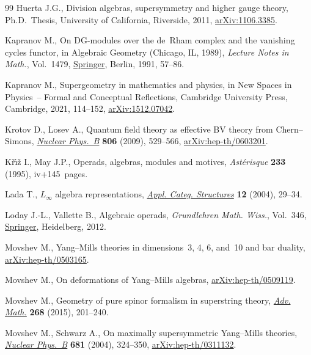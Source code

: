 \documentclass[pdftex]{sigma}
\numberwithin{equation}{section}
\begin{document}
\begin{thebibliography}{99}
Huerta J.G., Division algebras, supersymmetry and higher gauge theory, Ph.D.~Thesis, {U}niversity of California, Riverside, 2011, \href{https://arxiv.org/abs/1106.3385}{arXiv:1106.3385}.

Kapranov M., On {DG}-modules over the de~{R}ham complex and the vanishing
 cycles functor, in Algebraic {G}eometry ({C}hicago, {IL}, 1989),
 \textit{Lecture Notes in Math.}, Vol.~1479, \href{https://doi.org/10.1007/BFb0086264}{Springer}, Berlin, 1991, 57--86.

Kapranov M., Supergeometry in mathematics and physics, in New Spaces in
 Physics~-- Formal and Conceptual Reflections, Cambridge University Press,
 Cambridge, 2021, 114--152, \href{https://arxiv.org/abs/1512.07042}{arXiv:1512.07042}.

Krotov D., Losev A., Quantum field theory as effective {BV} theory from
 {C}hern--{S}imons, \href{https://doi.org/10.1016/j.nuclphysb.2008.07.021}{\textit{Nuclear Phys.~B}} \textbf{806} (2009), 529--566,
 \href{https://arxiv.org/abs/hep-th/0603201}{arXiv:hep-th/0603201}.

K\v{r}\'{\i}\v{z} I., May J.P., Operads, algebras, modules and motives,
 \textit{Ast\'erisque} \textbf{233} (1995), iv+145~pages.

Lada T., {$L_\infty$} algebra representations, \href{https://doi.org/10.1023/B:APCS.0000013809.71153.30}{\textit{Appl. Categ. Structures}}
 \textbf{12} (2004), 29--34.

Loday J.-L., Vallette B., Algebraic operads, \textit{Grundlehren Math. Wiss.},
 Vol.~346, \href{https://doi.org/10.1007/978-3-642-30362-3}{Springer}, Heidelberg, 2012.

Movshev M., {Y}ang--{M}ills theories in dimensions~3, 4, 6, and~10 and bar
 duality, \href{https://arxiv.org/abs/hep-th/0503165}{arXiv:hep-th/0503165}.

Movshev M., On deformations of {Y}ang--{M}ills algebras,
 \href{https://arxiv.org/abs/hep-th/0509119}{arXiv:hep-th/0509119}.

Movshev M., Geometry of pure spinor formalism in superstring theory,
 \href{https://doi.org/10.1016/j.aim.2014.09.014}{\textit{Adv. Math.}} \textbf{268} (2015), 201--240.

Movshev M., Schwarz A., On maximally supersymmetric {Y}ang--{M}ills theories,
 \href{https://doi.org/10.1016/j.nuclphysb.2003.12.033}{\textit{Nuclear Phys.~B}} \textbf{681} (2004), 324--350,
 \href{https://arxiv.org/abs/hep-th/0311132}{arXiv:hep-th/0311132}.


\end{thebibliography}
\end{document}
